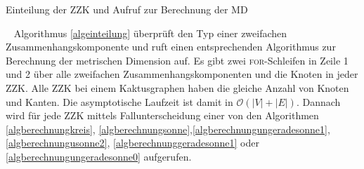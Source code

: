 \begin{algorithm}
\caption{Einteilung der ZZK und Aufruf zur Berechnung der MD}
\begin{algorithmic}[1]
\FORALL{($x \in ZZK$%
)}{
\FORALL{($v \in x$)}{ 
\STATE Erhöhe $K[x]$ um eins für jeden Knoten $v$ mit $Klasse[v]=0$ oder $Klasse[v]=A$;
\STATE Erhöhe $S[x]$ um eins für jeden Knoten $v$ mit $Klasse[v]\neq 0$;
\STATE Erhöhe $Anker[x]$ um eins für jeden Knoten $v$ mit $Klasse[v]=A$;
}\ENDFOR
\IF{($x.Knoten==S[x]$)}{\STATE $S(x)$;}\ELSIF{($x.Knoten==K[x]$)}{\STATE $K(x)$;}\ELSE{\IF{($Anker[x] \leq 2$ oder $Anker[x] \geq \frac{n}{2}$)}{
		\IF{($(n\; \textbf{mod} \; 2)==1$ oder $n==4$)}
		{		 \STATE $USU(x)$;
			}
		\ELSIF{($(n\; \textbf{mod} \; 2)==0$)}{
		\IF{($Anker[x]==0$)}{\STATE $USG0(x)$;}
			\ELSE{\STATE $USG1(x)$;}
			\ENDIF
		}\ENDIF}
	\ELSE{\STATE $US(x)$;
	}\ENDIF}\ENDIF
}\ENDFOR
\vspace{2mm}
\end{algorithmic}
\label{algeinteilung}
\end{algorithm}
\vspace{-2mm}
~\linebreak
Algorithmus \ref{algeinteilung} überprüft den Typ einer zweifachen Zusammenhangskomponente und ruft einen entsprechenden Algorithmus zur Berechnung der metrischen Dimension auf. Es gibt zwei \textsc{for}-Schleifen in Zeile 1 und 2 über alle zweifachen Zusammenhangskomponenten und die Knoten in jeder ZZK. 
Alle ZZK bei einem Kaktusgraphen haben die gleiche Anzahl von Knoten und Kanten. Die asymptotische Laufzeit ist damit in $\mathcal{O}(|V|+|E|)$. Dannach wird für jede ZZK mittels Fallunterscheidung einer von den Algorithmen \ref{algberechnungkreis}, \ref{algberechnungsonne},\ref{algberechnungungeradesonne1}, \ref{algberechnungusonne2}, \ref{algberechnunggeradesonne1} oder \ref{algberechnungungeradesonne0} aufgerufen.
\newpage

